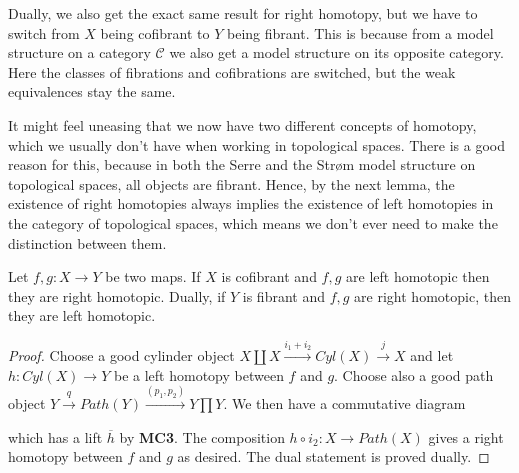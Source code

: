Dually, we also get the exact same result for right homotopy, but we have to switch from $X$ being cofibrant to $Y$ being fibrant. This is because from a model structure on a category $\mathcal{C}$ we also get a model structure on its opposite category. Here the classes of fibrations and cofibrations are switched, but the weak equivalences stay the same. 

It might feel uneasing that we now have two different concepts of homotopy, which we usually don't have when working in topological spaces. There is a good reason for this, because in both the Serre and the Strøm model structure on topological spaces, all objects are fibrant. Hence, by the next lemma, the existence of right homotopies always implies the existence of left homotopies in the category of topological spaces, which means we don’t ever need to make the distinction between them.

\begin{lemma}
Let $f,g:X\rightarrow Y$ be two maps. If $X$ is cofibrant and $f,g$ are left homotopic then they are right homotopic. Dually, if $Y$ is fibrant and $f,g$ are right homotopic, then they are left homotopic.
\end{lemma}
\begin{proof}
Choose a good cylinder object $X\coprod X \overset{i_1 + i_2}\rightarrow Cyl(X) \overset{j}\rightarrow X$ and let $h:Cyl(X)\rightarrow Y$ be a left homotopy between $f$ and $g$. Choose also a good path object $Y\overset{q}\rightarrow Path(Y) \overset{(p_1, p_2)}\rightarrow Y\prod Y$. We then have a commutative diagram
\begin{center}
\end{center}
which has a lift $\overline{h}$ by \textbf{MC3}. 
The composition $h\circ i_2:X\rightarrow Path(X)$ gives a right homotopy between $f$ and $g$ as desired. The dual statement is proved dually.
\end{proof}

